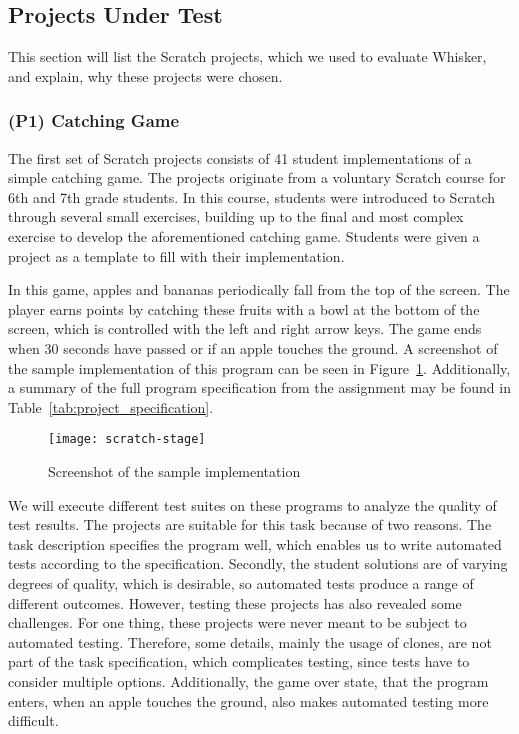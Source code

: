 \subsection{Projects Under Test}

This section will list the Scratch projects,
which we used to evaluate Whisker,
and explain, why these projects were chosen.

\subsubsection{(P1) Catching Game}

The first set of Scratch projects consists of 41 student implementations of a simple catching game.
The projects originate from a voluntary Scratch course for 6th and 7th grade students.
In this course, students were introduced to Scratch through several small exercises,
building up to the final and most complex exercise to develop the aforementioned catching game.
Students were given a project as a template to fill with their implementation.
\parspace

In this game, apples and bananas periodically fall from the top of the screen.
The player earns points by catching these fruits with a bowl at the bottom of the screen,
which is controlled with the left and right arrow keys.
The game ends when 30 seconds have passed or if an apple touches the ground.
A screenshot of the sample implementation of this program can be seen in Figure~\ref{fig:screenshot_of_the_sample_implementation}.
Additionally, a summary of the full program specification from the assignment may be found in Table~\ref{tab:project_specification}.
\parspace

\begin{figure}[ht]
    \centering
    \texttt{[image: scratch-stage]}
    \caption{Screenshot of the sample implementation}
    \label{fig:screenshot_of_the_sample_implementation}
\end{figure}

We will execute different test suites on these programs to analyze the quality of test results.
The projects are suitable for this task because of two reasons.
The task description specifies the program well, which enables us to write automated tests according to the specification.
Secondly, the student solutions are of varying degrees of quality,
which is desirable, so automated tests produce a range of different outcomes.
However, testing these projects has also revealed some challenges.
For one thing, these projects were never meant to be subject to automated testing.
Therefore, some details, mainly the usage of clones,
are not part of the task specification, which complicates testing,
since tests have to consider multiple options.
Additionally, the game over state, that the program enters,
when an apple touches the ground, also makes automated testing more difficult.
\parspace

